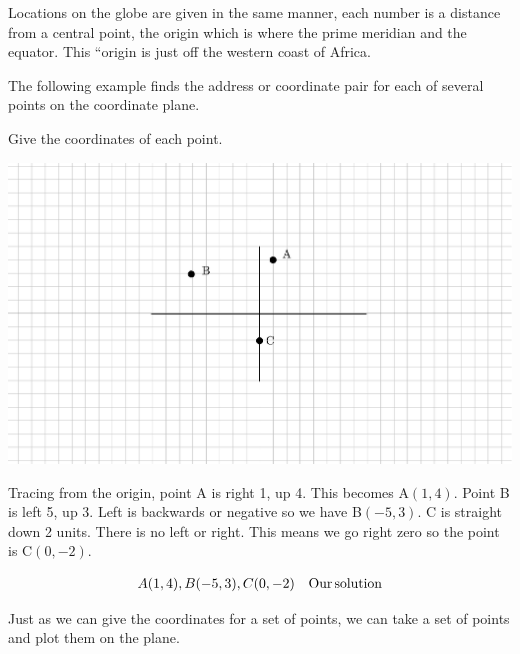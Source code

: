 {}Locations on the globe are given in the same
manner, each number is a distance from a central point, the origin which is
where the prime meridian and the equator. This ``origin is just off the
western coast of Africa.\pp

 The following example finds the address or coordinate pair for each of
several points on the coordinate plane.

\begin{example} \label{Lin42}
 Give the coordinates of each point.
  
  \begin{multicols}{2}
    \includegraphics[scale=.9,bb = 115 65 310 190, clip=true]{II_1_3b-2.eps}
    
     Tracing from the origin, point A is right 1, up 4. This becomes A$(1, 4)$.
    Point B is left 5, up 3. Left is backwards or negative so we have B$(- 5,
    3)$. C is straight down 2 units. There is no left or right. This means we
    go right zero so the point is C$(0, - 2)$.
  \end{multicols}
  \begin{eqnarray*}
    A (1, 4), B (- 5, 3), C (0, - 2) &  & \operatorname{Our} \operatorname{solution}
  \end{eqnarray*}
\end{example}

 Just as we can give the coordinates for a set of points, we can take a set of
points and plot them on the plane.

